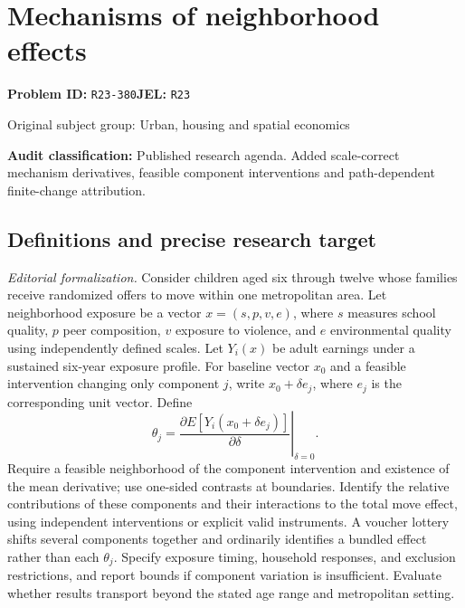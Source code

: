 \documentclass[11pt,a4paper]{article}
\begin{document}
\section*{Mechanisms of neighborhood effects}
\textbf{Problem ID:} \texttt{R23-380}\quad \textbf{JEL:} \texttt{R23}\par
\label{problem:OP-0466}
{\sffamily\small\color{muted}Original subject group: Urban, housing and spatial economics\par}
\label{definitions:problem:30007748}
\textbf{Audit classification:} Published research agenda. Added scale-correct mechanism derivatives, feasible component interventions and path-dependent finite-change attribution.
\subsection*{Definitions and precise research target}
\textit{Editorial formalization.} Consider children aged six through twelve whose families receive randomized offers to move within one metropolitan area. Let neighborhood exposure be a vector \(x=(s,p,v,e)\), where \(s\) measures school quality, \(p\) peer composition, \(v\) exposure to violence, and \(e\) environmental quality using independently defined scales. Let \(Y_i(x)\) be adult earnings under a sustained six-year exposure profile. For baseline vector \(x_0\) and a feasible intervention changing only component \(j\), write \(x_0+\delta e_j\), where \(e_j\) is the corresponding unit vector. Define
\[\theta_j=\left.\frac{\partial E[Y_i(x_0+\delta e_j)]}{\partial\delta}\right|_{\delta=0}.\]
Require a feasible neighborhood of the component intervention and existence of the mean derivative; use one-sided contrasts at boundaries. Identify the relative contributions of these components and their interactions to the total move effect, using independent interventions or explicit valid instruments. A voucher lottery shifts several components together and ordinarily identifies a bundled effect rather than each \(\theta_j\). Specify exposure timing, household responses, and exclusion restrictions, and report bounds if component variation is insufficient. Evaluate whether results transport beyond the stated age range and metropolitan setting.
\end{document}
